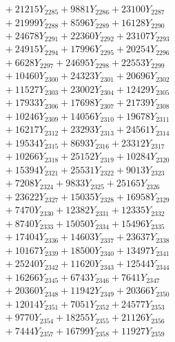 \documentclass[a4paper,10pt]{article}
\begin{document}
{\begin{align}
&\;  + 21215 Y_{2285} + 9881 Y_{2286} + 23100 Y_{2287} \\[0.3ex]
&\;  + 21999 Y_{2288} + 8596 Y_{2289} + 16128 Y_{2290} \\[0.3ex]
&\;  + 24678 Y_{2291} + 22360 Y_{2292} + 23107 Y_{2293} \\[0.3ex]
&\;  + 24915 Y_{2294} + 17996 Y_{2295} + 20254 Y_{2296} \\[0.3ex]
&\;  + 6628 Y_{2297} + 24695 Y_{2298} + 22553 Y_{2299} \\[0.3ex]
&\;  + 10460 Y_{2300} + 24323 Y_{2301} + 20696 Y_{2302} \\[0.3ex]
&\;  + 11527 Y_{2303} + 23002 Y_{2304} + 12429 Y_{2305} \\[0.3ex]
&\;  + 17933 Y_{2306} + 17698 Y_{2307} + 21739 Y_{2308} \\[0.5ex]\allowbreak
&\;  + 10246 Y_{2309} + 14056 Y_{2310} + 19678 Y_{2311} \\[0.3ex]
&\;  + 16217 Y_{2312} + 23293 Y_{2313} + 24561 Y_{2314} \\[0.3ex]
&\;  + 19534 Y_{2315} + 8693 Y_{2316} + 23312 Y_{2317} \\[0.3ex]
&\;  + 10266 Y_{2318} + 25152 Y_{2319} + 10284 Y_{2320} \\[0.3ex]
&\;  + 15394 Y_{2321} + 25531 Y_{2322} + 9013 Y_{2323} \\[0.3ex]
&\;  + 7208 Y_{2324} + 9833 Y_{2325} + 25165 Y_{2326} \\[0.3ex]
&\;  + 23622 Y_{2327} + 15035 Y_{2328} + 16958 Y_{2329} \\[0.3ex]
&\;  + 7470 Y_{2330} + 12382 Y_{2331} + 12335 Y_{2332} \\[0.3ex]
&\;  + 8740 Y_{2333} + 15050 Y_{2334} + 15496 Y_{2335} \\[0.3ex]
&\;  + 17404 Y_{2336} + 14603 Y_{2337} + 23637 Y_{2338} \\[0.5ex]\allowbreak
&\;  + 10167 Y_{2339} + 18500 Y_{2340} + 13497 Y_{2341} \\[0.3ex]
&\;  + 25240 Y_{2342} + 11620 Y_{2343} + 12544 Y_{2344} \\[0.3ex]
&\;  + 16266 Y_{2345} + 6743 Y_{2346} + 7641 Y_{2347} \\[0.3ex]
&\;  + 20360 Y_{2348} + 11942 Y_{2349} + 20366 Y_{2350} \\[0.3ex]
&\;  + 12014 Y_{2351} + 7051 Y_{2352} + 24577 Y_{2353} \\[0.3ex]
&\;  + 9770 Y_{2354} + 18255 Y_{2355} + 21126 Y_{2356} \\[0.3ex]
&\;  + 7444 Y_{2357} + 16799 Y_{2358} + 11927 Y_{2359} \\[0.3ex]

\end{align}}
\end{document}
